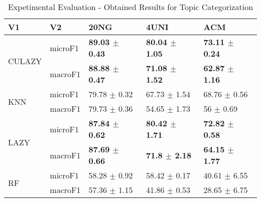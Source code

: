 \documentclass[]{article}
\begin{document}
\begin{table}[ht]
\centering
\begin{tabular}{lllll}
  \hline
V1 & V2 & 20NG & 4UNI & ACM \\ 
  \hline
\multirow{2}{*}{CULAZY} & microF1 & \bf{89.03 $\pm$  0.43} & \bf{80.04 $\pm$  1.05} & \bf{73.11 $\pm$  0.24} \\ 
   & macroF1 & \bf{88.88 $\pm$  0.47} & \bf{71.08 $\pm$  1.52} & \bf{62.87 $\pm$  1.16} \\ 
  \multirow{2}{*}{KNN} & microF1 & 79.78 $\pm$  0.32 & 67.73 $\pm$  1.54 & 68.76 $\pm$  0.56 \\ 
   & macroF1 & 79.73 $\pm$  0.36 & 54.65 $\pm$  1.73 & 56 $\pm$  0.69 \\ 
  \multirow{2}{*}{LAZY} & microF1 & \bf{87.84 $\pm$  0.62} & \bf{80.42 $\pm$  1.71} & \bf{72.82 $\pm$  0.58} \\ 
   & macroF1 & \bf{87.69 $\pm$  0.66} & \bf{71.8 $\pm$  2.18} & \bf{64.15 $\pm$  1.77} \\ 
  \multirow{2}{*}{RF} & microF1 & 58.28 $\pm$  0.92 & 58.42 $\pm$  0.17 & 40.61 $\pm$  6.55 \\ 
   & macroF1 & 57.36 $\pm$  1.15 & 41.86 $\pm$  0.53 & 28.65 $\pm$  6.75 \\ 
   \hline
\end{tabular}
\caption{Expetimental Evaluation - Obtained Results for Topic Categorization} 
\end{table}
\end{document}
